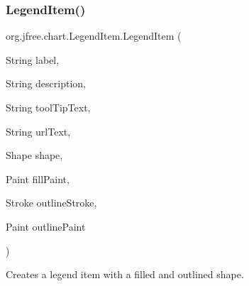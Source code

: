 \subsubsection{\texorpdfstring{Legend\+Item()}{LegendItem()}\hspace{0.1cm}{\footnotesize\ttfamily [4/10]}}
{\footnotesize\ttfamily org.\+jfree.\+chart.\+Legend\+Item.\+Legend\+Item (\begin{DoxyParamCaption}\item[{String}]{label,  }\item[{String}]{description,  }\item[{String}]{tool\+Tip\+Text,  }\item[{String}]{url\+Text,  }\item[{Shape}]{shape,  }\item[{Paint}]{fill\+Paint,  }\item[{Stroke}]{outline\+Stroke,  }\item[{Paint}]{outline\+Paint }\end{DoxyParamCaption})}

Creates a legend item with a filled and outlined shape.


